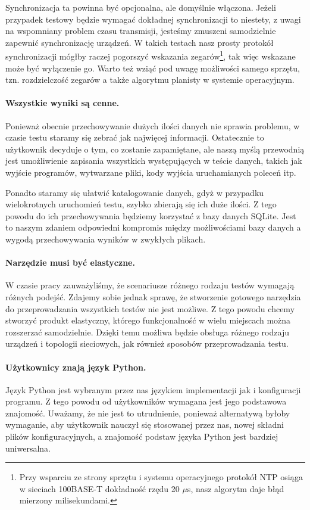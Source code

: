 \documentclass[00-praca-magisterska.tex]{subfiles}
\begin{document}
Synchronizacja ta powinna być opcjonalna, ale domyślnie włączona. Jeżeli
przypadek testowy będzie wymagać dokładnej synchronizacji to niestety, z uwagi
na wspomniany problem czasu transmisji, jesteśmy zmuszeni samodzielnie zapewnić
synchronizację urządzeń. W takich testach nasz prosty protokół synchronizacji
mógłby raczej pogorszyć wskazania zegarów\footnote{Przy wsparciu ze strony
sprzętu i systemu operacyjnego protokół NTP osiąga w sieciach 100BASE-T
dokładność rzędu 20 $\mu$s\cite{ntp-research}, nasz algorytm daje błąd mierzony
milisekundami.}, tak więc wskazane może być wyłączenie go. Warto też wziąć pod
uwagę możliwości samego sprzętu, tzn. rozdzielczość zegarów a także
algorytmu planisty w systemie operacyjnym.

\paragraph{Wszystkie wyniki są cenne.} Ponieważ obecnie przechowywanie dużych
ilości danych nie sprawia problemu, w czasie testu staramy się zebrać jak
najwięcej informacji. Ostatecznie to użytkownik decyduje o tym, co zostanie
zapamiętane, ale naszą myślą przewodnią jest umożliwienie zapisania wszystkich
występujących w teście danych, takich jak wyjście programów, wytwarzane pliki,
kody wyjścia uruchamianych poleceń itp.

Ponadto staramy się ułatwić katalogowanie danych, gdyż w przypadku
wielokrotnych uruchomień testu, szybko zbierają się ich duże ilości. Z tego
powodu do ich przechowywania będziemy korzystać z bazy danych SQLite. Jest to
naszym zdaniem odpowiedni kompromis między możliwościami bazy danych a wygodą
przechowywania wyników w zwykłych plikach.

\paragraph{Narzędzie musi być elastyczne.} W czasie pracy zauważyliśmy, że
scenariusze różnego rodzaju testów wymagają różnych podejść.  Zdajemy sobie
jednak sprawę, że stworzenie gotowego narzędzia do przeprowadzania wszystkich
testów nie jest możliwe. Z tego powodu chcemy stworzyć produkt elastyczny,
którego funkcjonalność w wielu miejscach można rozszerzać samodzielnie. Dzięki
temu możliwa będzie obsługa różnego rodzaju urządzeń i topologii sieciowych,
jak również sposobów przeprowadzania testu.

\paragraph{Użytkownicy znają język Python.} Język Python jest wybranym przez nas
językiem implementacji jak i konfiguracji programu. Z tego powodu od
użytkowników wymagana jest jego podstawowa znajomość. Uważamy, że nie jest to
utrudnienie, ponieważ alternatywą byłoby wymaganie, aby użytkownik nauczył się
stosowanej przez nas, nowej składni plików konfiguracyjnych, a znajomość podstaw
języka Python jest bardziej uniwersalna.
\end{document}
